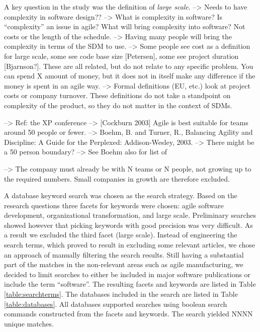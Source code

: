 \documentclass[preprint,authoryear,12pt]{elsarticle}
\begin{document}
A key question in the study was the definition of \emph{large scale}.
--> Needs to have complexity in software design?? --> What is complexity in software?
    Is ``complexity'' an issue in agile?
    What will bring complexity into software? Not costs or the length of the
    schedule. --> Having many people will bring the complexity in terms of the
    SDM to use.
--> Some people see cost as a definition for large scale, some see code base
    size [Petersen], some see project duration [Bjarnson?]. These are all
    related, but do not relate to any specific problem. You can spend X amount
    of money, but it does not in itself make any difference if the money is
    spent in an agile way.
--> Formal definitions (EU, etc.) look at project costs or company turnover.
    These definitions do not take a standpoint on complexity of the product, so
    they do not matter in the context of SDMs.

--> Ref: the XP conference
--> [Cockburn 2003] Agile is best suitable for teams around 50 people or fewer.
--> Boehm, B. and Turner, R., Balancing Agility and Discipline: A Guide for the
    Perplexed: Addison-Wesley, 2003. --> There might be a 50 person boundary?
    --> See Boehm also for list of 

--> The company must already be with N teams or N people, not growing up to the
    required numbers. Small companies in growth are therefore excluded. 

A database keyword search was chosen as the search strategy. Based on the
research questions three facets for keywords were chosen: agile software
development, organizational transformation, and large scale. Preliminary
searches showed however that picking keywords with good precision was very
difficult. As a result we excluded the third facet (large scale). Instead of
engineering the search terms, which proved to result in excluding some
relevant articles, we chose an approach of manually filtering the search
results. Still having a substantial part of the matches in the non-relevant  
areas such as agile manufacturing, we decided to limit searches to either be
included in major software publications or include the term ``software''. The
resulting facets and keywords are listed in Table \ref{table:searchterms}. The
databases included in the search are listed in Table \ref{table:databases}. All
databases supported searches using boolean search commands constructed from the
facets and keywords. The search yielded NNNN unique matches.
\end{document}
